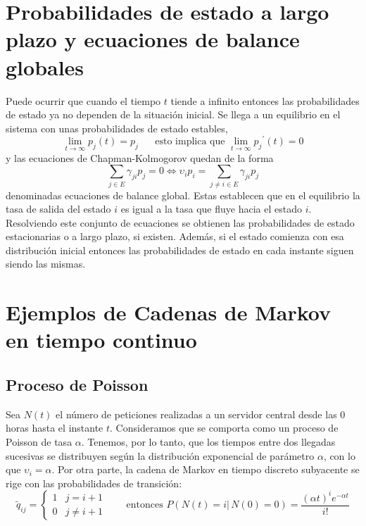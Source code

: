 \section{Probabilidades de estado a largo plazo y \hfill\break
ecuaciones de balance globales}
Puede ocurrir que cuando el tiempo $t$ tiende a infinito entonces
las probabilidades de estado ya no dependen de la situaci\'{o}n
inicial. Se llega a un equilibrio en el sistema con unas
probabilidades de estado estables,
\[
\displaystyle\lim_{t\to \infty}p_j(t)=p_j \hspace{20pt}\text{esto
implica que }\displaystyle\lim_{t\to \infty}{p_j}^{\prime}(t)=0
\]
y las ecuaciones de Chapman-Kolmogorov quedan de la forma
\[
\displaystyle\sum_{j\in E}\gamma_{ji}p_{j}=0 \Leftrightarrow
\upsilon_i p_i= \displaystyle\sum_{j\neq i\in E}\gamma_{ji}p_{j}
\]
denominadas ecuaciones de balance global. Estas establecen que en
el equilibrio la tasa de salida del estado $i$ es igual a la tasa
que fluye hacia el estado $i$. Resolviendo este conjunto de
ecuaciones se obtienen las probabilidades de estado estacionarias
o a largo plazo, si existen. Adem\'{a}s, si el estado comienza con esa
distribuci\'{o}n inicial entonces las probabilidades de estado en
cada instante siguen siendo las mismas.
\section{Ejemplos de Cadenas de Markov en  tiempo \hfill\break continuo}
\subsection{Proceso de Poisson}
Sea $N(t)$ el n\'{u}mero de peticiones realizadas a un servidor
central desde las 0 horas hasta el instante $t$. Consideramos que
se comporta como un proceso de Poisson de tasa $\alpha$. Tenemos,
por lo tanto, que los tiempos entre dos llegadas sucesivas se
distribuyen seg\'{u}n la distribuci\'{o}n exponencial de par\'{a}metro
$\alpha$, con lo que $\upsilon_i=\alpha$. Por otra parte, la
cadena de Markov en tiempo discreto subyacente se rige con las
probabilidades de transici\'{o}n:
\[
\tilde q_{ij}=\left\{\begin{array}{ll} 1&j=i+1\\
0&j\neq i+1
\end{array}\right.\hspace{20pt}\text{ entonces }
P(N(t)=i|\,N(0)=0)=\dfrac{(\alpha t)^ie^{-\alpha t}}{i!}
\]
